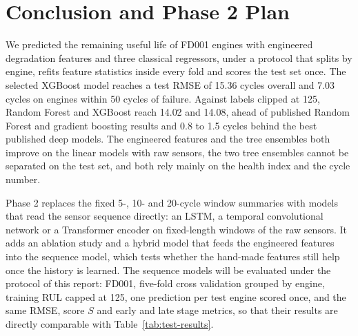 \section{Conclusion and Phase 2 Plan}
\label{sec:conclusion}

We predicted the remaining useful life of FD001 engines with engineered
degradation features and three classical regressors, under a protocol that
splits by engine, refits feature statistics inside every fold and scores
the test set once. The selected XGBoost model reaches a test RMSE of 15.36
cycles overall and 7.03 cycles on engines within 50 cycles of failure.
Against labels clipped at 125, Random Forest and XGBoost reach 14.02 and
14.08, ahead of published Random Forest and gradient boosting results and
0.8 to 1.5 cycles behind the best published deep models. The engineered
features and the tree ensembles both improve on the linear models with raw
sensors, the two tree ensembles cannot be separated on the test set, and
both rely mainly on the health index and the cycle number.

Phase 2 replaces the fixed 5-, 10- and 20-cycle window summaries with models that read the
sensor sequence directly: an LSTM, a temporal convolutional network or a
Transformer encoder on fixed-length windows of the raw sensors. It adds an
ablation study and a hybrid model that feeds the engineered features into
the sequence model, which tests whether the hand-made features still help
once the history is learned. The sequence models will be evaluated under
the protocol of this report: FD001, five-fold cross validation grouped by
engine, training RUL capped at 125, one prediction per test engine scored
once, and the same RMSE, score $S$ and early and late stage metrics, so
that their results are directly comparable with Table~\ref{tab:test-results}.
